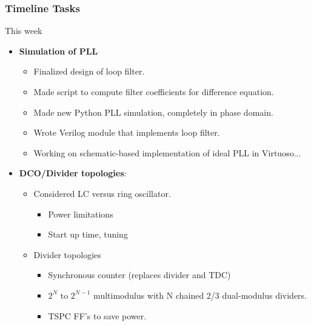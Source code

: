 \documentclass[t, screen, aspectratio=43]{beamer}
\begin{document}
\begin{frame}
	\frametitle{Timeline Tasks}
	\begin{block}{This week}
		\begin{itemize}
			\footnotesize
			\item \textbf{Simulation of PLL}
			\begin{itemize}
				\footnotesize
				\item Finalized design of loop filter.
				\item Made script to compute filter coefficients for difference equation.
				\item Made new Python PLL simulation, completely in phase domain.
				\item Wrote Verilog module that implements loop filter.
				\item Working on schematic-based implementation of ideal PLL in Virtuoso...
			\end{itemize} 
			\item \textbf{DCO/Divider topologies}:
			\begin{itemize}
				\footnotesize
				\item Considered LC versus ring oscillator.
				\begin{itemize}
					\scriptsize
					\item Power limitations
					\item Start up time, tuning
				\end{itemize}
				\item Divider topologies
				\begin{itemize}
					\scriptsize
					\item Synchronous counter (replaces divider and TDC)
					\item $2^{N}$ to $2^{N-1}$ multimodulus with N chained 2/3 dual-modulus dividers.
					\item TSPC FF's to save power. 
				\end{itemize}
			\end{itemize} 
		\end{itemize}    
	\end{block}
\end{frame}

\end{document}
